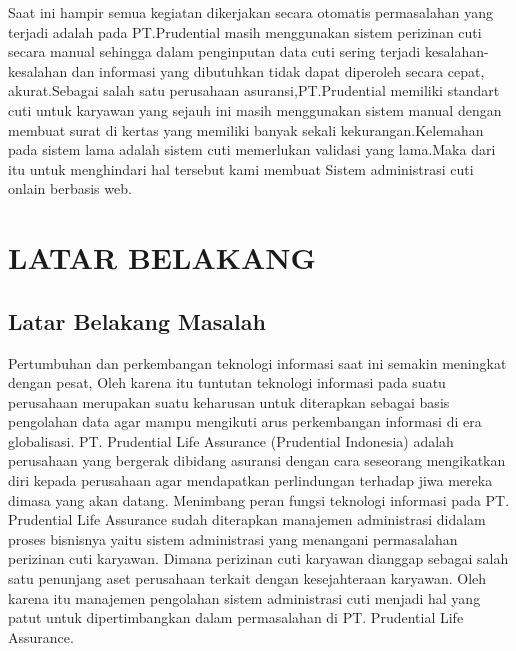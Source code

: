 \documentclass{jtetiproposalskripsi}
\begin{document}
\cover
\approvalpage



\begin{abstractind}
Saat ini hampir semua kegiatan dikerjakan secara otomatis permasalahan yang terjadi adalah pada PT.Prudential masih menggunakan sistem perizinan cuti secara manual sehingga dalam penginputan data cuti sering terjadi kesalahan-kesalahan dan informasi yang dibutuhkan tidak dapat diperoleh secara cepat, akurat.Sebagai salah satu perusahaan asuransi,PT.Prudential memiliki standart cuti untuk karyawan  yang sejauh ini masih menggunakan sistem manual dengan membuat surat di kertas yang memiliki banyak sekali kekurangan.Kelemahan pada sistem lama adalah sistem cuti memerlukan validasi yang lama.Maka dari itu untuk menghindari hal tersebut kami membuat Sistem administrasi cuti onlain berbasis web.




\end{abstractind}

\tableofcontents
{}
\clearpage{}\setcounter{page}{1}

\chapter{LATAR BELAKANG}

\section{Latar Belakang Masalah}
	Pertumbuhan dan perkembangan teknologi informasi saat ini semakin meningkat dengan pesat, Oleh karena itu tuntutan teknologi informasi pada suatu perusahaan merupakan suatu keharusan untuk diterapkan sebagai basis pengolahan data agar mampu mengikuti arus perkembangan informasi di era globalisasi. PT. Prudential Life Assurance (Prudential Indonesia) adalah perusahaan yang bergerak dibidang asuransi dengan cara seseorang mengikatkan diri kepada perusahaan agar mendapatkan perlindungan terhadap jiwa mereka dimasa yang akan datang. Menimbang peran fungsi teknologi informasi pada PT. Prudential Life Assurance sudah diterapkan manajemen administrasi didalam proses bisnisnya yaitu sistem administrasi yang menangani permasalahan perizinan cuti karyawan. Dimana perizinan cuti karyawan dianggap sebagai salah satu penunjang aset perusahaan terkait dengan kesejahteraan karyawan. Oleh karena itu manajemen pengolahan sistem administrasi cuti menjadi hal yang patut untuk dipertimbangkan dalam permasalahan di PT. Prudential Life Assurance.
\end{document}
